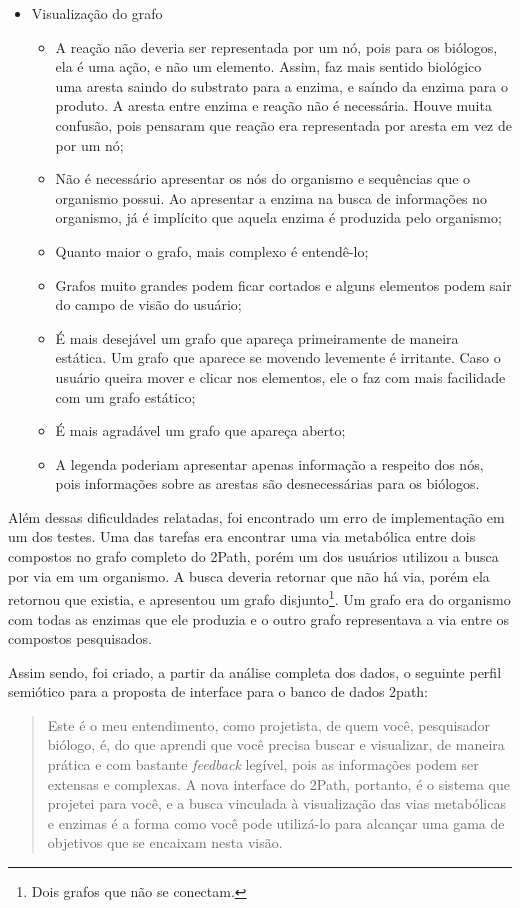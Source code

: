 \begin{itemize}
\item Visualização do grafo
  \begin{itemize}
  \item[1] A reação não deveria ser representada por um nó, pois para os biólogos, ela é uma ação, e não um elemento. Assim, faz mais sentido biológico uma aresta saindo do substrato para a enzima, e saíndo da enzima para o produto. A aresta entre enzima e reação não é necessária. Houve muita confusão, pois pensaram que reação era representada por aresta em vez de por um nó;
  \item[2] Não é necessário apresentar os nós do organismo e sequências que o organismo possui. Ao apresentar a enzima na busca de informações no organismo, já é implícito que aquela enzima é produzida pelo organismo;
  \item[3] Quanto maior o grafo, mais complexo é entendê-lo;
  \item[4] Grafos muito grandes podem ficar cortados e alguns elementos podem sair do campo de visão do usuário;
  \item[5] É mais desejável um grafo que apareça primeiramente de maneira estática. Um grafo que aparece se movendo levemente é irritante. Caso o usuário queira mover e clicar nos elementos, ele o faz com mais facilidade com um grafo estático;
  \item[6] É mais agradável um grafo que apareça aberto;
  \item[7] A legenda poderiam apresentar apenas informação a respeito dos nós, pois informações sobre as arestas são desnecessárias para os biólogos.
  \end{itemize}
\end{itemize}


\indent Além dessas dificuldades relatadas, foi encontrado um erro de implementação em um dos testes. Uma das tarefas era encontrar uma via metabólica entre dois compostos no grafo completo do 2Path, porém um dos usuários utilizou a busca por via em um organismo. A busca deveria retornar que não há via, porém ela retornou que existia, e apresentou um grafo disjunto\footnote{Dois grafos que não se conectam.}. Um grafo era do organismo com todas as enzimas que ele produzia e o outro grafo representava a via entre os compostos pesquisados.

\indent Assim sendo, foi criado, a partir da análise completa dos dados, o seguinte perfil semiótico para a proposta de interface para o banco de dados 2path:

\begin{quote}
	Este é o meu entendimento, como projetista, de quem você, pesquisador biólogo, é, do que aprendi que você precisa buscar e visualizar, de maneira prática e com bastante \textit{feedback} legível, pois as informações podem ser extensas e complexas. A nova interface do 2Path, portanto, é o sistema que projetei para você, e a busca vinculada à visualização das vias metabólicas e enzimas é a forma como você pode utilizá-lo para alcançar uma gama de objetivos que se encaixam nesta visão.
\end{quote}

